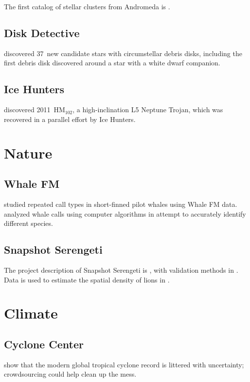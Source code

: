 \documentclass[twocolumn]{aastex6}
\begin{document}
The first catalog of stellar clusters from Andromeda is \citet{joh15}.

\subsection{Disk Detective}

\citet{kuc16} discovered 37~new candidate stars with circumstellar debris disks, including the first debris disk discovered around a star with a white dwarf companion.

\subsection{Ice Hunters}

\citet{par13} discovered 2011~HM$_{102}$, a high-inclination L5 Neptune Trojan, which was recovered in a parallel effort by Ice Hunters.

\section{Nature}

\subsection{Whale FM}
\citet{say13} studied repeated call types in short-finned pilot whales using Whale FM data. \citet{sha14} analyzed whale calls using computer algorithms in attempt to accurately identify different species.

\subsection{Snapshot Serengeti}

The project description of Snapshot Serengeti is \citet{swa15}, with validation methods in \citet{swa16}. Data is used to estimate the spatial density of lions in \citet{cus15}.

\section{Climate}

\subsection{Cyclone Center}

\citet{hen14} show that the modern global tropical cyclone record is littered with uncertainty; crowdsourcing could help clean up the mess.
\end{document}
